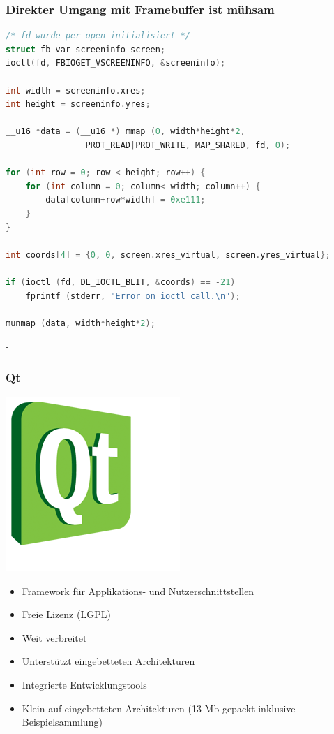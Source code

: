 \documentclass{beamer}
\begin{document}
	\begin{frame}
  \label{ioctl}
  \frametitle{Direkter Umgang mit Framebuffer ist mühsam}
		\begin{lstlisting}[language=C, basicstyle=\scriptsize]
/* fd wurde per open initialisiert */
struct fb_var_screeninfo screen;
ioctl(fd, FBIOGET_VSCREENINFO, &screeninfo);

int width = screeninfo.xres;
int height = screeninfo.yres;

__u16 *data = (__u16 *) mmap (0, width*height*2, 
                PROT_READ|PROT_WRITE, MAP_SHARED, fd, 0);

for (int row = 0; row < height; row++) {
    for (int column = 0; column< width; column++) {
        data[column+row*width] = 0xe111;
    }
}

int coords[4] = {0, 0, screen.xres_virtual, screen.yres_virtual};

if (ioctl (fd, DL_IOCTL_BLIT, &coords) == -21) 
    fprintf (stderr, "Error on ioctl call.\n");

munmap (data, width*height*2);
		\end{lstlisting}
    \hyperlink{backtoqt}{-}
	\end{frame}	
	
	\begin{frame}
		\frametitle{Qt}
		\begin{floatingfigure}[l]{1.75cm}
			\includegraphics[scale=0.3]{img/qt-logo}
		\end{floatingfigure}
    \begin{itemize}
      \item Framework für Applikations- und Nutzerschnittstellen
      \item Freie Lizenz (LGPL)
      \item Weit verbreitet 
      \item Unterstützt eingebetteten Architekturen
      \item Integrierte Entwicklungstools
      \item Klein auf eingebetteten Architekturen (13 Mb gepackt inklusive
        Beispielsammlung)
    \end{itemize}
	\end{frame}	
\end{document}
